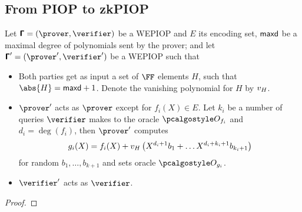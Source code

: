 \documentclass[runningheads,11pt]{llncs}
\begin{document}
\subsection{From PIOP to zkPIOP}

\begin{theorem}
  Let $\PIOP = (\prover, \verifier)$ be a WEPIOP and $E$ its encoding set,
  $\mathsf{maxd}$ be a maximal degree of polynomials sent by the prover; and
  let $\PIOP' = (\prover', \verifier')$ be a WEPIOP such that
  \begin{itemize}
  \item Both parties get as input a set of $\FF$ elements $H$, such that
    $\abs{H} = \maxdeg + 1$. Denote the vanishing polynomial for $H$ by $v_{H}$.
  \item $\prover'$ acts as $\prover$ except for $f_i(X) \in E$. Let $k_i$ be a
    number of queries $\verifier$ makes to the oracle $\oracleo_{f_i}$ and
    $d_i = \deg(f_i)$, then $\prover'$ computes
      \[
        g_i(X) = f_i(X) + v_{H}\left(X^{d_i + 1} b_1 + \ldots
        X^{d_i + k_i + 1} b_{k_i + 1}\right)
      \]
      for random $b_1, \ldots, b_{k + 1}$ and sets oracle $\oracleo_{g_i}$.
    \item $\verifier'$ acts as $\verifier$. 
  \end{itemize}
\end{theorem}
\begin{proof}


\end{proof}
\end{document}
